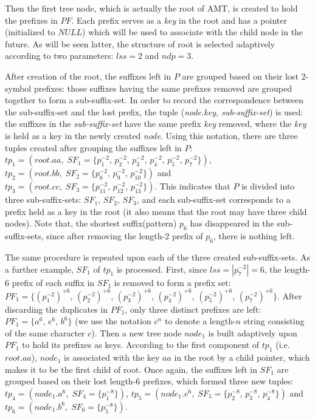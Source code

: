 \documentclass{article}
\begin{document}
Then the first tree node, which is actually the root of AMT, is
created to hold the prefixes in $PF$. Each prefix serves as a
\emph{key} in the root and has a pointer (initialized to $NULL$) which
will be used to associate with the child node in the future. As will
be seen latter, the structure of root is selected adaptively according
to two parameters: $lss=2$ and $ndp=3$.

After creation of the root, the suffixes left in $P$ are grouped based
on their lost 2-symbol prefixes: those suffixes having the same
prefixes removed are grouped together to form a sub-suffix-set. In
order to record the correspondence between the sub-suffix-set and the
lost prefix, the tuple (\emph{node.key,\; sub-suffix-set}) is used:
the suffixes in the \emph{sub-suffix-set} have the same prefix
\emph{key} removed, where the \emph{key} is held as a key in the newly
created \emph{node}. Using this notation, there are three tuples
created after grouping the suffixes left in $P$:
$tp_1 = (root.aa,\; SF_1=\{p_1^{-2},\, p_2^{-2},\, p_3^{-2},\,
p_4^{-2},\, p_5^{-2},\, p_7^{-2}\})$,\,
$tp_2 = (root.bb,\; SF_2=\{p_8^{-2},\, p_9^{-2},\, p_{10}^{-2}\})$ and
$tp_3 = (root.cc,\; SF_3=\{p_{11}^{-2},\, p_{12}^{-2},\,
p_{13}^{-2}\})$. This indicates that $P$ is divided into three
sub-suffix-sets: $SF_1$, $SF_2$, $SF_3$, and each sub-suffix-set
corresponds to a prefix held as a key in the root (it also means that
the root may have three child nodes). Note that, the shortest
suffix(pattern) $p_6$ has disappeared in the sub-suffix-sets, since
after removing the length-2 prefix of $p_6$, there is nothing left.

The same procedure is repeated upon each of the three created
sub-suffix-sets. As a further example, $SF_1$ of $tp_1$ is
processed. First, since $lss = |p_7^{-2}| = 6$, the length-$6$ prefix
of each suffix in $SF_1$ is removed to form a prefix set:
$PF_1 = \{(p_1^{-2})^{+6},\, (p_2^{-2})^{+6},\, (p_3^{-2})^{+6},\,
(p_4^{-2})^{+6},\, (p_5^{-2})^{+6},\, (p_7^{-2})^{+6}\}$. After
discarding the duplicates in $PF_1$, only three distinct prefixes are
left: $PF_1 = \{a^6,\, e^6,\, b^6\}$ (we use the notation $c^n$ to
denote a length-$n$ string consisting of the same character $c$). Then
a new tree node $node_1$ is built adaptively upon $PF_1$ to hold its
prefixes as keys.  According to the first component of $tp_1$
(i.e. $root.aa$), $node_1$ is associated with the key $aa$ in the root
by a child pointer, which makes it to be the first child of root. Once
again, the suffixes left in $SF_1$ are grouped based on their lost
length-6 prefixes, which formed three new tuples:
$tp_4 = (node_1.a^6,\; SF_4=\{p_1^{-8}\})$,
$tp_5 = (node_1.e^6,\; SF_5=\{p_2^{-8},\, p_3^{-8},\, p_4^{-8}\})$ and
$tp_6 = (node_1.b^6,\; SF_6=\{p_5^{-8}\})$.
\end{document}
